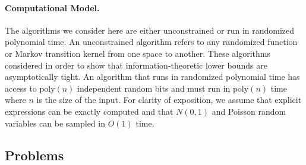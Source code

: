 
\paragraph{Computational Model.} The algorithms we consider here are either unconstrained or run in randomized polynomial time. An unconstrained algorithm refers to any randomized function or Markov transition kernel from one space to another. These algorithms considered in order to show that information-theoretic lower bounds are asymptotically tight. An algorithm that runs in randomized polynomial time has access to $\text{poly}(n)$ independent random bits and must run in $\text{poly}(n)$ time where $n$ is the size of the input. For clarity of exposition, we assume that explicit expressions can be exactly computed and that $N(0, 1)$ and Poisson random variables can be sampled in $O(1)$ time. %

\subsection{Problems}
\label{ss:formulations}


